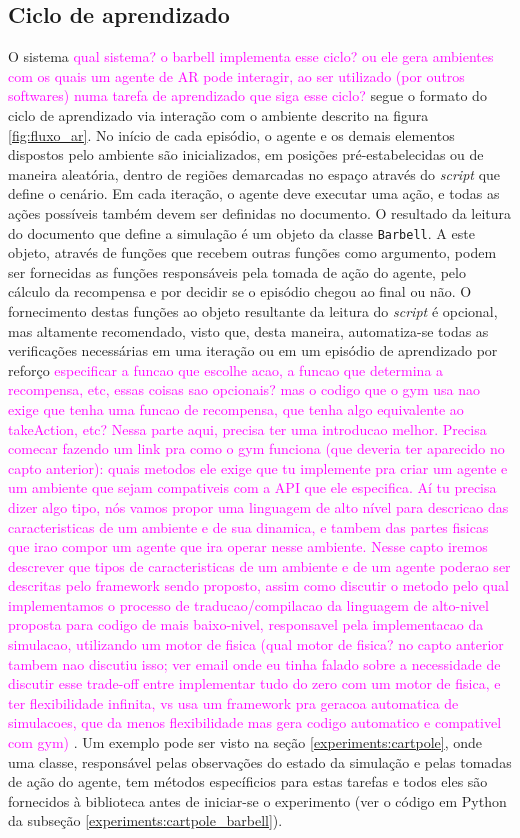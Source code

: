 \documentclass[cic,tc]{iiufrgs}
\newcommand\bruno[1]{\textcolor{magenta}{#1}}
\begin{document}
\subsection{Ciclo de aprendizado}
O sistema \bruno{qual sistema? o barbell implementa esse ciclo? ou ele gera ambientes com os quais um agente de AR pode interagir, ao ser utilizado (por outros softwares) numa tarefa de aprendizado que siga esse ciclo?} segue o formato do ciclo de aprendizado via interação com o ambiente descrito na figura \ref{fig:fluxo_ar}. No início de cada episódio, o agente e os demais
elementos dispostos pelo ambiente são inicializados, em posições pré-estabelecidas ou de maneira  aleatória, dentro de regiões demarcadas no espaço através do \textit{script}
que define o cenário. Em cada iteração, o agente deve executar uma ação, e todas as ações possíveis também devem ser definidas no documento. O resultado da leitura do
documento que define a simulação é um objeto da classe \texttt{Barbell}. A este objeto, através de funções que recebem outras funções como argumento, podem ser
fornecidas as funções responsáveis pela tomada de ação do agente, pelo cálculo da recompensa e por decidir se o episódio chegou ao final ou não. O fornecimento
destas funções ao objeto resultante da leitura do \textit{script} é opcional, mas altamente recomendado, visto que, desta maneira, automatiza-se todas as verificações
necessárias em uma iteração ou em um episódio de aprendizado por reforço \bruno{especificar a funcao que escolhe acao, a funcao que determina a recompensa, etc, essas coisas sao opcionais? mas o codigo que o gym usa nao exige que tenha uma funcao de recompensa, que tenha algo equivalente ao takeAction, etc? Nessa parte aqui, precisa ter uma introducao melhor. Precisa comecar fazendo um link pra como o gym funciona (que deveria ter aparecido no capto anterior): quais metodos ele exige que tu implemente pra criar um agente e um ambiente que sejam compativeis com a API que ele especifica. Aí tu precisa dizer algo tipo, nós vamos propor uma linguagem de alto nível para descricao das caracteristicas de um ambiente e de sua dinamica, e tambem das partes fisicas que irao compor um agente que ira operar nesse ambiente. Nesse capto iremos descrever que tipos de caracteristicas de um ambiente e de um agente poderao ser descritas pelo framework sendo proposto, assim como discutir o metodo pelo qual implementamos o processo de traducao/compilacao da linguagem de alto-nivel proposta para codigo de mais baixo-nivel, responsavel pela implementacao da simulacao, utilizando um motor de fisica (qual motor de fisica? no capto anterior tambem nao discutiu isso; ver email onde eu tinha falado sobre a necessidade de discutir esse trade-off entre implementar tudo do zero com um motor de fisica, e ter flexibilidade infinita, vs usa um framework pra geracoa automatica de simulacoes, que da menos flexibilidade mas gera codigo automatico e compativel com gym)} . Um exemplo pode ser visto na seção \ref{experiments:cartpole}, onde uma classe, responsável
pelas observações do estado da simulação e pelas tomadas de ação do agente, tem métodos específicios para estas tarefas e todos eles são fornecidos à biblioteca
antes de iniciar-se o experimento (ver o código em Python da subseção \ref{experiments:cartpole_barbell}).
\end{document}
